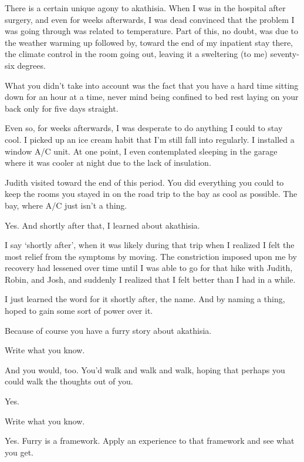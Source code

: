 \noindent There is a certain unique agony to akathisia. When I was in the hospital after surgery, and even for weeks afterwards, I was dead convinced that the problem I was going through was related to temperature. Part of this, no doubt, was due to the weather warming up followed by, toward the end of my inpatient stay there, the climate control in the room going out, leaving it a sweltering (to me) seventy-six degrees.

\begin{ally}
What you didn't take into account was the fact that you have a hard time sitting down for an hour at a time, never mind being confined to bed rest laying on your back only for five days straight.
\end{ally}
Even so, for weeks afterwards, I was desperate to do anything I could to stay cool. I picked up an ice cream habit that I'm still fall into regularly. I installed a window A/C unit. At one point, I even contemplated sleeping in the garage where it was cooler at night due to the lack of insulation.

\begin{ally}
Judith visited toward the end of this period. You did everything you could to keep the rooms you stayed in on the road trip to the bay as cool as possible. The bay, where A/C just isn't a thing.
\end{ally}
Yes. And shortly after that, I learned about akathisia.

I say `shortly after', when it was likely during that trip when I realized I felt the most relief from the symptoms by moving. The constriction imposed upon me by recovery had lessened over time until I was able to go for that hike with Judith, Robin, and Josh, and suddenly I realized that I felt better than I had in a while.

I just learned the word for it shortly after, the name. And by naming a thing, hoped to gain some sort of power over it.

\begin{ally}
Because of course you have a furry story about akathisia.
\end{ally}
Write what you know.

\begin{ally}
And you would, too. You'd walk and walk and walk, hoping that perhaps you could walk the thoughts out of you.
\end{ally}
Yes.

\begin{ally}
Write what you know.
\end{ally}
Yes. Furry is a framework. Apply an experience to that framework and see what you get.

